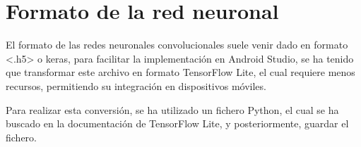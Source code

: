 \section{Formato de la red neuronal}

El formato de las redes neuronales convolucionales suele venir dado en formato <.h5> o keras, para facilitar la implementación en Android Studio, se ha tenido que transformar este archivo en formato TensorFlow Lite, el cual requiere menos recursos, permitiendo su integración en dispositivos móviles.

Para realizar esta conversión, se ha utilizado un fichero Python, el cual se ha buscado en la documentación de TensorFlow Lite, y posteriormente, guardar el fichero. \cite{tensorflowliteConverter}



